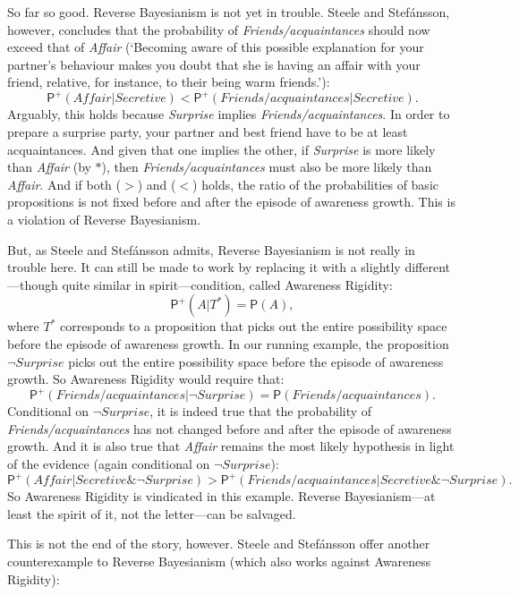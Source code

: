 \documentclass[
  11pt,
  dvipsnames,enabledeprecatedfontcommands]{scrartcl}
\newcommand{\pr}[1]{\ensuremath{\mathsf{P}(#1)}}
\newcommand{\ppr}[2]{\ensuremath{\mathsf{P}^{#1}(#2)}}
\begin{document}
So far so good. Reverse Bayesianism is not yet in trouble. Steele and
Stefánsson, however, concludes that the probability of
\textit{Friends/acquaintances} should now exceed that of \textit{Affair}
(`Becoming aware of this possible explanation for your partner's
behaviour makes you doubt that she is having an affair with your friend,
relative, for instance, to their being warm friends.'):
\[\ppr{+}{\textit{Affair} \vert  \textit{Secretive} } < \ppr{+}{\textit{Friends/acquaintances} \vert \textit{Secretive}}. \tag{<}\]
Arguably, this holds because \textit{Surprise} implies
\textit{Friends/acquaintances}. In order to prepare a surprise party,
your partner and best friend have to be at least acquaintances. And
given that one implies the other, if \textit{Surprise} is more likely
than \textit{Affair} (by \(*\)), then \textit{Friends/acquaintances}
must also be more likely than \textit{Affair}. And if both (\(>\)) and
(\(<\)) holds, the ratio of the probabilities of basic propositions is
not fixed before and after the episode of awareness growth. This is a
violation of Reverse Bayesianism.

But, as Steele and Stefánsson admits, Reverse Bayesianism is not really
in trouble here. It can still be made to work by replacing it with a
slightly different---though quite similar in spirit---condition, called
Awareness Rigidity: \[\ppr{+}{A \vert T^*}=\pr{A},\] where \(T^*\)
corresponds to a proposition that picks out the entire possibility space
before the episode of awareness growth. In our running example, the
proposition \(\neg\textit{Surprise}\) picks out the entire possibility
space before the episode of awareness growth. So Awareness Rigidity
would require that:
\[\ppr{+}{\textit{Friends/acquaintances} \vert \neg\textit{Surprise}}=\pr{\textit{Friends/acquaintances}}.\]
Conditional on \(\neg\textit{Surprise}\), it is indeed true that the
probability of \textit{Friends/acquaintances} has not changed before and
after the episode of awareness growth. And it is also true that
\textit{Affair} remains the most likely hypothesis in light of the
evidence (again conditional on \(\neg\textit{Surprise}\)):
\[\ppr{+}{\textit{Affair} \vert  \textit{Secretive} \& \neg\textit{Surprise} } > \ppr{+}{\textit{Friends/acquaintances} \vert \textit{Secretive} \& \neg\textit{Surprise}}. \tag{$>^+$}\]
So Awareness Rigidity is vindicated in this example. Reverse
Bayesianism---at least the spirit of it, not the letter---can be
salvaged.

This is not the end of the story, however. Steele and Stefánsson offer
another counterexample to Reverse Bayesianism (which also works against
Awareness Rigidity):
\end{document}
